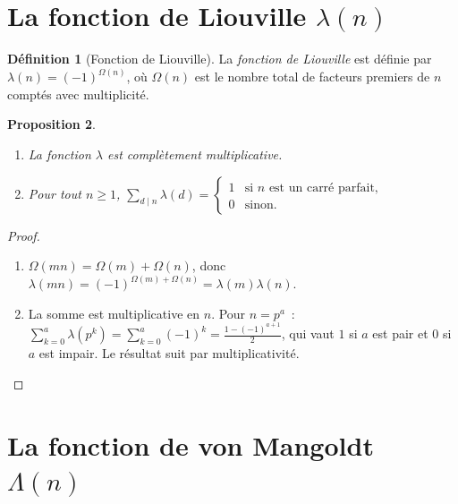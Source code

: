 \documentclass[12pt,a4paper,openany]{book}
\theoremstyle{definition}
\newtheorem{definition}{Définition}[chapter]
\theoremstyle{plain}
\newtheorem{proposition}[definition]{Proposition}
\theoremstyle{remark}
\begin{document}
\section{La fonction de Liouville $\lambda(n)$}
\label{sec:liouville}

\begin{definition}[Fonction de Liouville]
\label{def:liouville}
La \emph{fonction de Liouville} est définie par $\lambda(n) = (-1)^{\Omega(n)}$, où
$\Omega(n)$ est le nombre total de facteurs premiers de $n$
comptés avec multiplicité.
\end{definition}

\begin{proposition}
\label{prop:liouville-proprietes}
\begin{enumerate}[label=(\roman*)]
  \item La fonction $\lambda$ est complètement multiplicative.
  \item Pour tout $n \geq 1$,
    $\displaystyle\sum_{d \mid n} \lambda(d) = \begin{cases}
      1 & \text{si $n$ est un carré parfait,} \\
      0 & \text{sinon.}
    \end{cases}$
\end{enumerate}
\end{proposition}

\begin{proof}
\begin{enumerate}[label=(\roman*)]
  \item $\Omega(mn) = \Omega(m) + \Omega(n)$, donc $\lambda(mn) = (-1)^{\Omega(m)+\Omega(n)}
    = \lambda(m)\lambda(n)$.
  \item La somme est multiplicative en $n$. Pour $n = p^a$~:
    $\sum_{k=0}^{a} \lambda(p^k) = \sum_{k=0}^{a} (-1)^k = \frac{1-(-1)^{a+1}}{2}$,
    qui vaut $1$ si $a$ est pair et $0$ si $a$ est impair.
    Le résultat suit par multiplicativité. \qedhere
\end{enumerate}
\end{proof}

\section{La fonction de von Mangoldt $\Lambda(n)$}
\label{sec:von-mangoldt}
\end{document}

